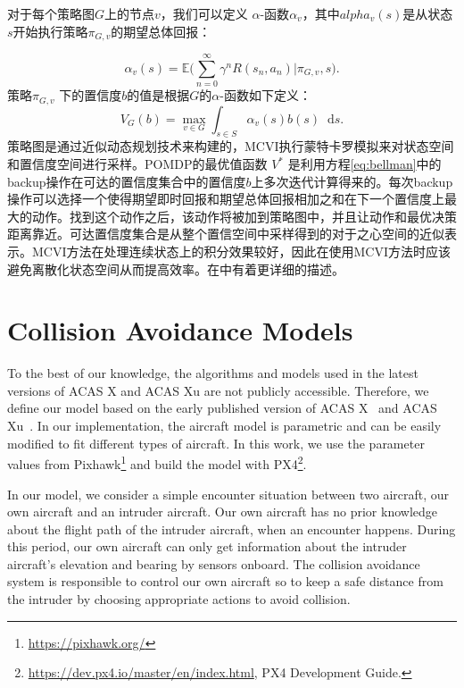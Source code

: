 \documentclass{article}
\newcommand{\expectation}{\mathbb{E}}
\newcommand{\reward}{R}
\newcommand{\discount}{\gamma}
\newcommand{\policy}{\pi}
\newcommand{\diff}[1]{\mathop{}\!\mathrm{d}#1}
\begin{document}
对于每个策略图$G$上的节点$v$，我们可以定义 $\alpha$-函数$\alpha_{v}$，其中$alpha_v(s)$是从状态$s$开始执行策略$\policy_{G,v}$的期望总体回报：

\begin{equation}
\label{eq:alphaPolicy}
	\alpha_{v}(s) = \expectation\big(\sum_{n=0}^{\infty} \discount^{n} \reward(s_{n}, a_{n}) | \policy_{G,v}, s\big).
\end{equation}
策略$\policy_{G,v}$ 下的置信度$b$的值是根据$G$的$\alpha$-函数如下定义：
\begin{equation}
	V_{G}(b) = \max_{v \in G} \int_{s\in S} \alpha_{v}(s) b(s) \diff{s}.
\end{equation}
策略图是通过近似动态规划技术来构建的，MCVI执行蒙特卡罗模拟来对状态空间和置信度空间进行采样。POMDP的最优值函数 $V^{*}$ 是利用方程\eqref{eq:bellman}中的backup操作在可达的置信度集合中的置信度$b$上多次迭代计算得来的。每次backup操作可以选择一个使得期望即时回报和期望总体回报相加之和在下一个置信度上最大的动作。找到这个动作之后，该动作将被加到策略图中，并且让动作和最优决策距离靠近。可达置信度集合是从整个置信空间中采样得到的对于之心空间的近似表示。MCVI方法在处理连续状态上的积分效果较好，因此在使用MCVI方法时应该避免离散化状态空间从而提高效率。在\cite{MCVI}中有着更详细的描述。


\section{Collision Avoidance Models}
\label{sec:collisionAvoidanceModels}

To the best of our knowledge, the algorithms and models used in the latest versions of ACAS X and ACAS Xu are not publicly accessible.
Therefore, we define our model based on the early published version of ACAS X~\cite{ACASX} and ACAS Xu~\cite{DBLP:conf/rss/Bai-RSS-11}.
In our implementation, the aircraft model is parametric and can be easily modified to fit different types of aircraft.
In this work, we use the parameter values from Pixhawk\footnote{\url{https://pixhawk.org/}} and build the model with PX4\footnote{\url{https://dev.px4.io/master/en/index.html}, PX4 Development Guide.}. 

In our model, we consider a simple encounter situation between two aircraft, our own aircraft and an intruder aircraft.
Our own aircraft has no prior knowledge about the flight path of the intruder aircraft, when an encounter happens.
During this period, our own aircraft can only get information about the intruder aircraft's elevation and bearing by sensors onboard.
The collision avoidance system is responsible to control our own aircraft so to keep a safe distance from the intruder by choosing appropriate actions to avoid collision. 
\end{document}
